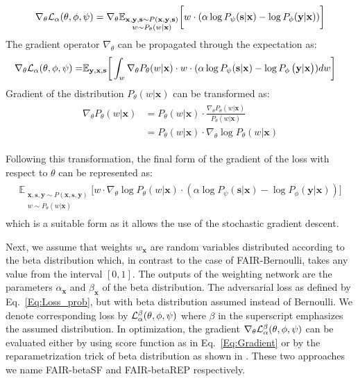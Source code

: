 \documentclass[preprint,12pt]{elsarticle}
\begin{document}
\begin{equation}
\nabla_{\theta}{\cal L}_{\alpha}(\theta, \phi, \psi) = \nabla_{\theta} \mathbb{E}_{\substack{\mathbf{x},\mathbf{y}, \mathbf{s} \sim P(\mathbf{x},\mathbf{y}, \mathbf{s})\\w \sim P_\theta(w|\mathbf{x})}} \bigg[ w \cdot ( \alpha \log P_{\psi}(\mathbf{s}|\mathbf{x}) - \log P_{\phi}(\mathbf{y}|\mathbf{x}))\bigg]
\end{equation}
The gradient operator $\nabla_{\theta}$ can be propagated through the expectation as:
\begin{align}
\begin{split}
\nabla_{\theta}{\cal L}_{\alpha}(\theta, \phi, \psi) =& \mathbb{E}_{\mathbf{y},\mathbf{x},\mathbf{s}} \bigg[ \int_w \nabla_{\theta}  P_\theta(w|\mathbf{x}) \cdot w \cdot ( \alpha \log P_{\psi}(\mathbf{s}|\mathbf{x}) - \log P_{\phi}\left(\mathbf{y}|\mathbf{x}\right))dw \bigg]
\end{split}
\end{align}
Gradient of the distribution $P_\theta(w|\mathbf{x})$ can be transformed as:
\begin{align}
\begin{split}
\nabla_{\theta}  P_\theta(w|\mathbf{x}) &= P_\theta(w|\mathbf{x}) \cdot \frac{\nabla_{\theta}P_\theta(w|\mathbf{x}) }{ P_\theta(w|\mathbf{x})}
\\
&= P_\theta(w|\mathbf{x}) \cdot \nabla_{\theta} \log P_\theta(w|\mathbf{x})
\end{split}
\end{align}

Following this transformation, the final form of the gradient of the loss with respect to $\theta$ can be represented as:
\begin{align}
\label{Eq:Gradient}
\begin{split}
\mathbb{E}_{\substack{\mathbf{x}, \mathbf{s}, \mathbf{y}\sim P(\mathbf{x},\mathbf{s}, \mathbf{y})\\w \sim P_\theta(w|\mathbf{x})}} \Big[w\cdot \nabla_{\theta}  \log P_\theta(w|\mathbf{x}) \cdot (\alpha\log P_\psi(\mathbf{s}|\mathbf{x}) - \log P_\phi(\mathbf{y}|\mathbf{x})) \Big]
\end{split}
\end{align}
which is a suitable form as it allows the use of the stochastic gradient descent.

Next, we assume that weights $w_\mathbf{x}$ are random variables distributed according to the beta distribution which, in contrast to the case of FAIR-Bernoulli, takes any value from the interval $[0,1]$. The outputs of the weighting network are the parameters $\alpha_\mathbf{x}$ and $\beta_\mathbf{x}$ of the beta distribution. The adversarial loss as defined by Eq.~\ref{Eq:Loss_prob}, but with beta distribution assumed instead of Bernoulli. We denote corresponding loss by ${\cal L}^\beta_\alpha(\theta,\phi,\psi)$ where $\beta$ in the superscript emphasizes the assumed distribution. In optimization, the gradient $\nabla_{\theta}{\cal L}^\beta_{\alpha}(\theta, \phi, \psi)$
can be evaluated either by using score function as in Eq.~\ref{Eq:Gradient} or by the reparametrization trick of beta distribution as shown in \cite{shah2015empirical}. These two approaches we name FAIR-betaSF and FAIR-betaREP respectively.
\end{document}
